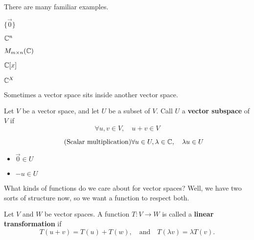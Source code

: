 There are many familiar examples.

\begin{example}[Zero]
    $\{ \vec{0} \}$
\end{example}


\begin{example}[$\C$]
    
\end{example}


\begin{example}[Tuples]
    $\mathbb{C}^n$
\end{example}


\begin{example}[Matrices]
    $M_{m\times n}(\mathbb{C})$
\end{example}


\begin{example}[Polynomials]
    $\mathbb{C}[x]$
\end{example}


\begin{example}[Functions]
    $\mathbb{C}^{X}$
\end{example}




Sometimes a vector space sits inside another vector space.

\begin{definition}[Subspace]
    Let $V$ be a vector space, and let $U$ be a subset of $V$.
    Call $U$ a {\bf vector subspace} of $V$ if
    \begin{equation*}\tag{Addition}
        \forall u,v\in V, \quad u+v\in V
    \end{equation*}

    \begin{equation*}\tag{Scalar multiplication}
        \forall u\in U, \lambda\in\mathbb{C}, \quad \lambda u\in U
    \end{equation*}
\end{definition}

\begin{exercise}
    \begin{itemize}
        \item $\vec{0} \in U$
        \item $-u\in U$ 
    \end{itemize}
\end{exercise}

What kinds of functions do we care about for vector spaces?
Well, we have two sorts of structure now, so we want a function to respect both.

\begin{definition}
    Let $V$ and $W$ be vector spaces.
    A function $T:V\to W$ is called a {\bf linear transformation} if
    \[
        T(u+v) = T(u) + T(w), \quad \text{and} \quad T(\lambda v) = \lambda T(v).
    \]
\end{definition}